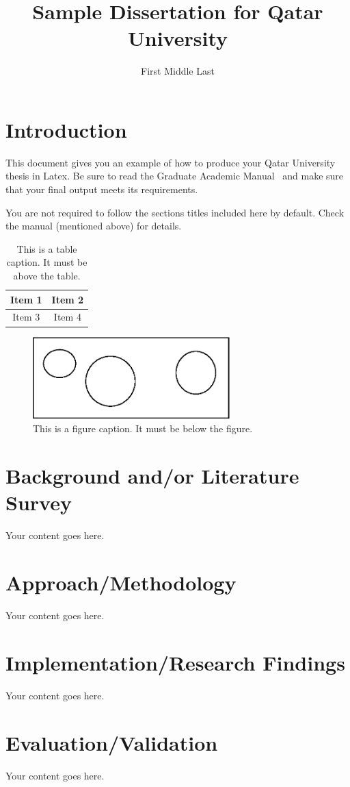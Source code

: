 \documentclass[12pt,lot,lof]{quthesis}
\title{Sample Dissertation for Qatar University}
\author{First Middle Last} %
\begin{document}
\makefrontmatter

\chapter{Introduction}
This document gives you an example of how to produce your Qatar 
University thesis in Latex.  Be sure to read the 
Graduate Academic Manual~\cite{qugam} and make sure that your
final output meets its requirements.

You are not required to follow the sections titles included here by default.
Check the manual (mentioned above) for details.

\begin{table}[t]
\centering
\caption{This is a table caption.  It must be above the table.}
\begin{tabular}{|c|c|}
\hline
Item 1 & Item 2 \\
\hline
Item 3 & Item 4 \\
\hline
\end{tabular}
\end{table}

\begin{figure}[t]
\centering
\includegraphics[width=3in]{samplefig.eps}
\caption{This is a figure caption.  It must be below the figure.}
\end{figure}

\chapter{Background and/or Literature Survey}
Your content goes here.

\chapter{Approach/Methodology}
Your content goes here.

\chapter{Implementation/Research Findings}
Your content goes here.

\chapter{Evaluation/Validation}
Your content goes here.
\end{document}
